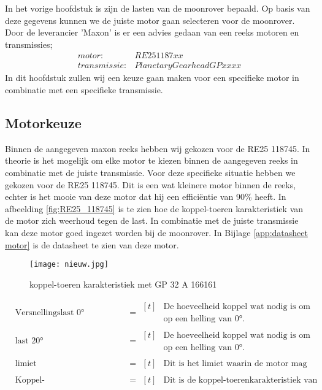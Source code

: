In het vorige hoofdstuk is zijn de lasten van de moonrover bepaald. Op basis van deze gegevens kunnen we de juiste motor gaan selecteren voor de moonrover. Door de leverancier 'Maxon' is er een advies gedaan van een reeks motoren en transmissies;
\begin{align*}
        motor: &RE25 1187xx\\
        transmissie: &Planetary Gearhead GP xx xx
\end{align*}
In dit hoofdstuk zullen wij een keuze gaan maken voor een specifieke motor in combinatie met een specifieke transmissie.


\subsection{Motorkeuze}
Binnen de aangegeven maxon reeks hebben wij gekozen voor de RE25 118745. In theorie is het mogelijk om elke motor te kiezen binnen de aangegeven reeks in combinatie met de juiste transmissie. Voor deze specifieke situatie hebben we gekozen voor de RE25 118745. Dit is een wat kleinere motor binnen de reeks, echter is het mooie van deze motor dat hij een efficiëntie van 90\% heeft. In afbeelding \ref{fig:RE25_118745} is te zien hoe de koppel-toeren karakteristiek van de motor zich weerhoud tegen de last. In combinatie met de juiste transmissie kan deze motor goed ingezet worden bij de moonrover. In Bijlage \ref{app:datasheet motor} is de datasheet te zien van deze motor.
\begin{figure}[H]
        \centering
        \texttt{[image: nieuw.jpg]}
        \caption{koppel-toeren karakteristiek met GP 32 A 166161}
        \label{fig:GP 32 A 166158}
\end{figure}

\begin{align*}
        & \text{Versnellingslast 0°} &&= \begin{aligned}[t] & \text{De hoeveelheid koppel wat nodig is om maximaal te versnellen} \\ & \text{op een helling van 0°.} \end{aligned}\\
        & \text{last 20°} &&= \begin{aligned}[t] & \text{De hoeveelheid koppel wat nodig is om stil te blijven staan} \\ & \text{op een helling van 0°.} \end{aligned}\\
        & \text{limiet} &&= \begin{aligned}[t] & \text{Dit is het limiet waarin de motor mag opereren.} \end{aligned}\\
        & \text{Koppel-toerenkarakteristiek motor} &&= \begin{aligned}[t] & \text{Dit is de koppel-toerenkarakteristiek van de motor.} \end{aligned}
    \end{align*}

